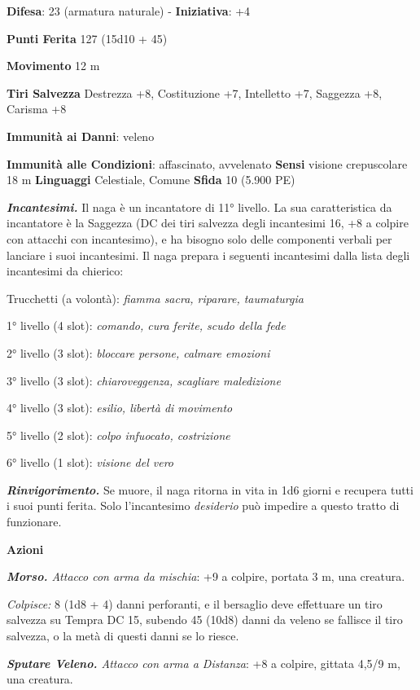 \begin{multicols}{2}
\textbf{Difesa}: 23 (armatura naturale) - \textbf{Iniziativa}: +4

\textbf{Punti Ferita} 127 (15d10 + 45)

\textbf{Movimento} 12 m

\textbf{Tiri Salvezza} Destrezza +8, Costituzione +7, Intelletto +7,
Saggezza +8, Carisma +8

\textbf{Immunità ai Danni}: veleno

\textbf{Immunità alle Condizioni}: affascinato, avvelenato \textbf{Sensi}
visione crepuscolare 18 m \textbf{Linguaggi} Celestiale,
Comune \textbf{Sfida} 10 (5.900 PE)\smallskip

\emph{\textbf{Incantesimi.}} Il naga è un incantatore di 11° livello. La
sua caratteristica da incantatore è la Saggezza (DC dei tiri salvezza
degli incantesimi 16, +8 a colpire con attacchi con incantesimo), e ha
bisogno solo delle componenti verbali per lanciare i suoi incantesimi.
Il naga prepara i seguenti incantesimi dalla lista degli incantesimi da
chierico:

Trucchetti (a volontà): \emph{fiamma sacra, riparare, taumaturgia}

1° livello (4 slot): \emph{comando, cura ferite, scudo della fede}

2° livello (3 slot): \emph{bloccare persone, calmare emozioni}

3° livello (3 slot): \emph{chiaroveggenza, scagliare maledizione}

4° livello (3 slot): \emph{esilio, libertà di movimento}

5° livello (2 slot): \emph{colpo infuocato, costrizione}

6° livello (1 slot): \emph{visione del vero}

\emph{\textbf{Rinvigorimento.}} Se muore, il naga ritorna in vita in 1d6
giorni e recupera tutti i suoi punti ferita. Solo l'incantesimo
\emph{desiderio} può impedire a questo tratto di funzionare.

\smallskip\textbf{Azioni}

\emph{\textbf{Morso.} Attacco con arma da mischia}: +9 a colpire,
portata 3 m, una creatura.

\emph{Colpisce:} 8 (1d8 + 4) danni perforanti, e il bersaglio deve
effettuare un tiro salvezza su Tempra DC 15, subendo 45 (10d8)
danni da veleno se fallisce il tiro salvezza, o la metà di questi danni
se lo riesce.

\emph{\textbf{Sputare Veleno.} Attacco con arma a Distanza}: +8 a
colpire, gittata 4,5/9 m, una creatura.


\end{multicols}
